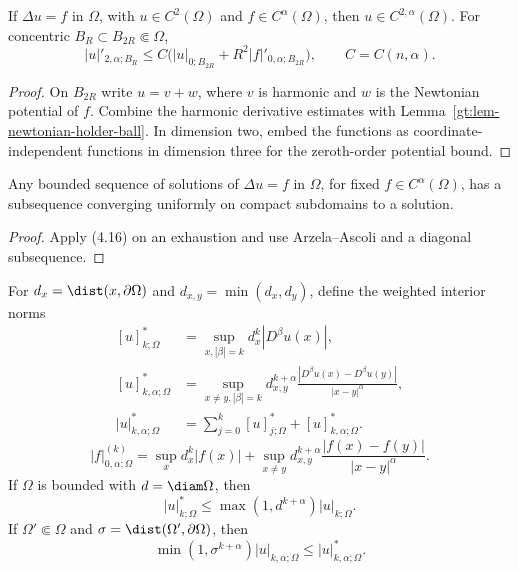 \begin{theorem}\label{gt:thm-poisson-interior-holder}
If $\Delta u=f$ in $\Omega$, with $u\in C^2(\Omega)$ and
$f\in C^\alpha(\Omega)$, then $u\in C^{2,\alpha}(\Omega)$. For concentric
$B_R\subset B_{2R}\Subset\Omega$,
\begin{equation}
\tag{4.16}
|u|'_{2,\alpha;B_R}
\leq C\bigl(|u|_{0;B_{2R}}+R^2|f|'_{0,\alpha;B_{2R}}\bigr),
\qquad C=C(n,\alpha).
\end{equation}
\end{theorem}
\begin{proof}
\sketch On $B_{2R}$ write $u=v+w$, where $v$ is harmonic and $w$ is the
Newtonian potential of $f$. Combine the harmonic derivative estimates with
Lemma~\ref{gt:lem-newtonian-holder-ball}. In dimension two, embed the
functions as coordinate-independent functions in dimension three for the
zeroth-order potential bound.
\end{proof}

\begin{corollary}\label{gt:cor-poisson-compactness}
Any bounded sequence of solutions of $\Delta u=f$ in $\Omega$, for fixed
$f\in C^\alpha(\Omega)$, has a subsequence converging uniformly on compact
subdomains to a solution.
\end{corollary}
\begin{proof}
\sketch Apply (4.16) on an exhaustion and use Arzela--Ascoli and a diagonal
subsequence.
\end{proof}

For $d_x=\dist(x,\partial\Omega)$ and
$d_{x,y}=\min(d_x,d_y)$, define the weighted interior norms
\begin{equation}
\tag{4.17}
\begin{aligned}
[u]^*_{k;\Omega}&=\sup_{x,|\beta|=k}d_x^k|D^\beta u(x)|,\\
[u]^*_{k,\alpha;\Omega}
&=\sup_{x\neq y,|\beta|=k}
d_{x,y}^{k+\alpha}
\frac{|D^\beta u(x)-D^\beta u(y)|}{|x-y|^\alpha},\\
|u|^*_{k,\alpha;\Omega}&=\sum_{j=0}^k[u]^*_{j;\Omega}
+[u]^*_{k,\alpha;\Omega}.
\end{aligned}
\end{equation}
\begin{equation}
\tag{4.18}
|f|^{(k)}_{0,\alpha;\Omega}
=\sup_x d_x^k|f(x)|+\sup_{x\neq y}d_{x,y}^{k+\alpha}
\frac{|f(x)-f(y)|}{|x-y|^\alpha}.
\end{equation}
If $\Omega$ is bounded with $d=\diam\Omega$, then
\begin{equation}
\tag{4.17'}
|u|^*_{k;\Omega}\leq\max(1,d^{k+\alpha})|u|_{k;\Omega}.
\end{equation}
If $\Omega'\Subset\Omega$ and $\sigma=\dist(\Omega',\partial\Omega)$, then
\begin{equation}
\tag{4.17''}
\min(1,\sigma^{k+\alpha})|u|_{k,\alpha;\Omega}
\leq|u|^*_{k,\alpha;\Omega}.
\end{equation}

